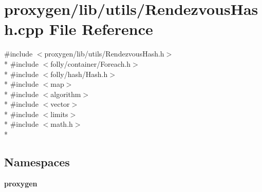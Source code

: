 \section{proxygen/lib/utils/\+Rendezvous\+Hash.cpp File Reference}
\label{RendezvousHash_8cpp}
{\ttfamily \#include $<$proxygen/lib/utils/\+Rendezvous\+Hash.\+h$>$}\\*
{\ttfamily \#include $<$folly/container/\+Foreach.\+h$>$}\\*
{\ttfamily \#include $<$folly/hash/\+Hash.\+h$>$}\\*
{\ttfamily \#include $<$map$>$}\\*
{\ttfamily \#include $<$algorithm$>$}\\*
{\ttfamily \#include $<$vector$>$}\\*
{\ttfamily \#include $<$limits$>$}\\*
{\ttfamily \#include $<$math.\+h$>$}\\*
\subsection*{Namespaces}
\begin{DoxyCompactItemize}
\item 
 {\bf proxygen}
\end{DoxyCompactItemize}
